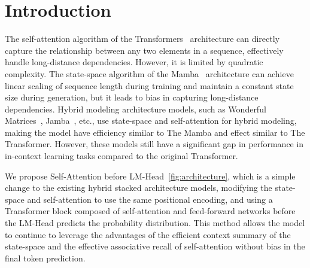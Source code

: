 \documentclass{article}
\theoremstyle{plain}
\theoremstyle{definition}
\theoremstyle{remark}
\begin{document}
\section{Introduction}
\label{submission}
The self-attention algorithm of the Transformers~\cite{wolf-etal-2020-transformers} architecture can directly capture the relationship between any two elements in a sequence, effectively handle long-distance dependencies. However, it is limited by quadratic complexity. The state-space algorithm of the Mamba~\cite{gu2023mamba} architecture can achieve linear scaling of sequence length during training and maintain a constant state size during generation, but it leads to bias in capturing long-distance dependencies. Hybrid modeling architecture models, such as Wonderful Matrices~\cite{shi2024wonderfulmatrices}, Jamba~\cite{lieber2024jamba}, etc., use state-space and self-attention for hybrid modeling, making the model have efficiency similar to The Mamba and effect similar to The Transformer. However, these models still have a significant gap in performance in in-context learning tasks compared to the original Transformer.

We propose Self-Attention before LM-Head~\ref{fig:architecture}, which is a simple change to the existing hybrid stacked architecture models, modifying the state-space and self-attention to use the same positional encoding, and using a Transformer block composed of self-attention and feed-forward networks before the LM-Head predicts the probability distribution. This method allows the model to continue to leverage the advantages of the efficient context summary of the state-space and the effective associative recall of self-attention without bias in the final token prediction.
\end{document}
